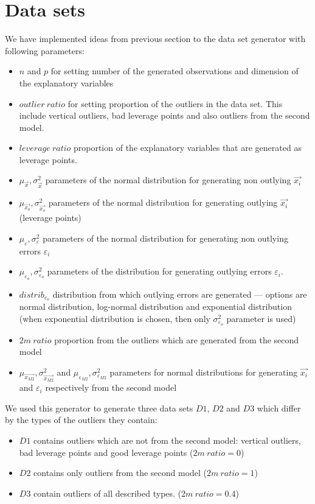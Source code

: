 \section{Data sets}
We have implemented ideas from previous section to the data set generator with following parameters:
\begin{itemize}
    \item $n$ and $p$ for setting number of the generated observations and dimension of the explanatory variables
    \item $outlier~ratio$ for setting proportion of the outliers in the data set. This include vertical outliers, bad leverage points and also outliers from the second model.
    \item $leverage~ratio$ proportion of the explanatory variables that are generated as leverage points.
    \item $\mu_{\vec{x}}, \sigma^{2}_{\vec{x}}$ parameters of the normal distribution for generating non outlying $\vec{x_i}$
    \item $\mu_{\vec{x_o}}, \sigma^{2}_{\vec{x_o}}$ parameters of the normal distribution for generating outlying $\vec{x_i}$ (leverage points)
    \item $\mu_{\varepsilon}, \sigma^{2}_{\varepsilon}$ parameters of the normal distribution for generating non outlying errors $\varepsilon_i$
    \item $\mu_{\varepsilon_o}, \sigma^{2}_{\varepsilon_o}$ parameters of the distribution for generating outlying errors $\varepsilon_i$. 
    \item $distrib_{\varepsilon_o}$ distribution from which outlying errors are generated --- options are normal distribution, log-normal distribution and exponential distribution (when exponential distribution is chosen, then only $\sigma^{2}_{\varepsilon_o}$ parameter is used)
    \item $2m~ratio$ proportion from the outliers which are generated from the second model
    \item $\mu_{\vec{x_{M2}}}, \sigma^{2}_{\vec{x_{M2}}}$ and $\mu_{\varepsilon_{M2}}, \sigma^{2}_{\varepsilon_{M2}}$ parameters for normal distributions for generating $\vec{x_i}$ and $\varepsilon_i$ respectively from the second model
\end{itemize}

We used this generator to generate three data sets $D1$, $D2$ and $D3$ which differ by the types of the outliers they contain:
\begin{itemize}
    \item $D1$ contains outliers which are not from the second model: vertical outliers, bad leverage points and good leverage points ($2m~ratio = 0$)
    \item $D2$ contains only outliers from the second model ($2m~ratio = 1$)
    \item $D3$ contain outliers of all described types. ($2m~ratio = 0.4$)
\end{itemize}

